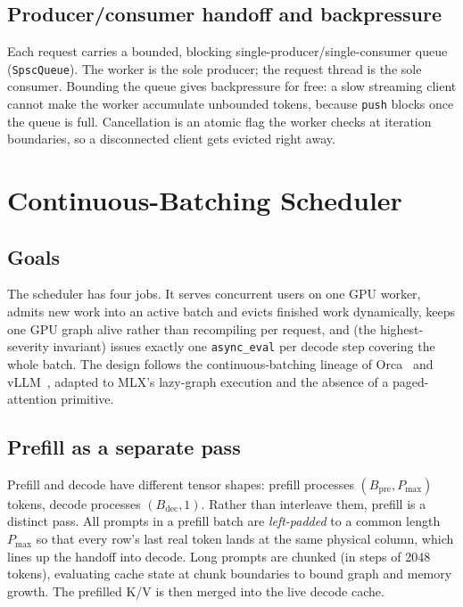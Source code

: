 \documentclass[11pt,a4paper]{report}
\newcommand{\code}[1]{\texttt{#1}}
\begin{document}
\section{Producer/consumer handoff and backpressure}
Each request carries a bounded, blocking single-producer/single-consumer queue
(\code{SpscQueue}). The worker is the sole producer; the request thread is the sole
consumer. Bounding the queue gives backpressure for free: a slow streaming client
cannot make the worker accumulate unbounded tokens, because \code{push} blocks once
the queue is full. Cancellation is an atomic flag the worker checks at iteration
boundaries, so a disconnected client gets evicted right away.

\chapter{Continuous-Batching Scheduler}
\label{ch:batching}

\section{Goals}
The scheduler has four jobs. It serves concurrent users on one GPU worker, admits
new work into an active batch and evicts finished work dynamically, keeps one GPU
graph alive rather than recompiling per request, and (the highest-severity
invariant) issues exactly one \code{async\_eval} per decode step covering the whole
batch. The design follows the continuous-batching lineage of Orca~\citep{yu2022orca} and
vLLM~\citep{kwon2023vllm}, adapted to MLX's lazy-graph execution and the absence of
a paged-attention primitive.

\section{Prefill as a separate pass}
Prefill and decode have different tensor shapes: prefill processes
$(B_{\text{pre}}, P_{\max})$ tokens, decode processes $(B_{\text{dec}}, 1)$.
Rather than interleave them, prefill is a distinct pass. All prompts in a prefill
batch are \emph{left-padded} to a common length $P_{\max}$ so that every row's last
real token lands at the same physical column, which lines up the handoff into
decode. Long prompts are chunked (in steps of 2048 tokens), evaluating cache state
at chunk boundaries to bound graph and memory growth. The prefilled K/V is then
merged into the live decode cache.
\end{document}
